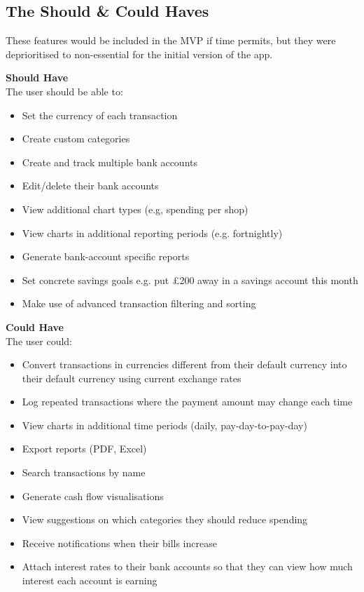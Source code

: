 \documentclass{l4proj}
\begin{document}
\subsection{The Should \& Could Haves}

These features would be included in the MVP if time permits, but they were deprioritised to non-essential for the initial version of the app.

\vspace{0.5em}
\textbf{Should Have}
\vspace{0.5em} \\
The user should be able to:
\begin{itemize}
    \item Set the currency of each transaction
    \item Create custom categories
    \item Create and track multiple bank accounts
    \item Edit/delete their bank accounts
    \item View additional chart types (e.g, spending per shop)
    \item View charts in additional reporting periods (e.g. fortnightly)
    \item Generate bank-account specific reports
    \item Set concrete savings goals e.g. put £200 away in a savings account this month
    \item Make use of advanced transaction filtering and sorting
\end{itemize}

\vspace{0.5em}
\textbf{Could Have}
\vspace{0.5em} \\
The user could:
\begin{itemize}
    \item Convert transactions in currencies different from their default currency into their default currency using current exchange rates
    \item Log repeated transactions where the payment amount may change each time
    \item View charts in additional time periods (daily, pay-day-to-pay-day)
    \item Export reports (PDF, Excel)
    \item Search transactions by name
    \item Generate cash flow visualisations
    \item View suggestions on which categories they should reduce spending
    \item Receive notifications when their bills increase
    \item Attach interest rates to their bank accounts so that they can view how much interest each account is earning
\end{itemize}
\end{document}
